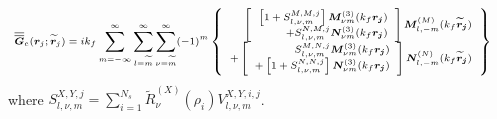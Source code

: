 \begin{equation}\label{eq:ElectricDGF_sphereenvironment} \scriptsize
\begin{split}
\overline{\overline{\boldsymbol{G}}}_{e}(\boldsymbol{r}_{j}; \widetilde{\boldsymbol{r}}_{j})
&= ik_{f} \sum\limits_{m=-\infty}^{\infty} \sum\limits_{l=\widetilde{m}}^{\infty} \sum_{\nu = \widetilde{m}}^{\infty} (-1)^{m}
\left\{ \begin{array}{r} \left[ \begin{array}{r}
\left[ 1 + S_{l,\nu,m}^{M,M,j} \right] \boldsymbol{M}_{\nu m}^{(3)}(k_{f} \boldsymbol{r_{j}})
\\
+ S_{l, \nu,m}^{N,M,j} \boldsymbol{N}_{\nu m}^{(3)}(k_{f} \boldsymbol{r_{j}})
\end{array} \right] \boldsymbol{M}_{l, -m}^{(M)}(k_{f} \boldsymbol{\widetilde{r}_{j}})
\\
+ \left[ \begin{array}{r}
S_{l, \nu,m}^{M,N,j} \boldsymbol{M}_{\nu m}^{(3)}(k_{f} \boldsymbol{r_{j}})
\\
+ \left[ 1 + S_{l,\nu,m}^{N,N,j} \right] \boldsymbol{N}_{\nu m}^{(3)}(k_{f} \boldsymbol{r_{j}})
\end{array} \right] \boldsymbol{N}_{l, -m}^{(N)}(k_{f} \boldsymbol{\widetilde{r}_{j}})
\end{array} \right\}
\end{split}
\end{equation}
%
where $S_{l,\nu,m}^{X,Y,j} = \sum_{i=1}^{N_{s}} \widetilde{R}_{\nu}^{(X)}(\rho_{i}) V_{l,\nu,m}^{X,Y,i,j}$. 

